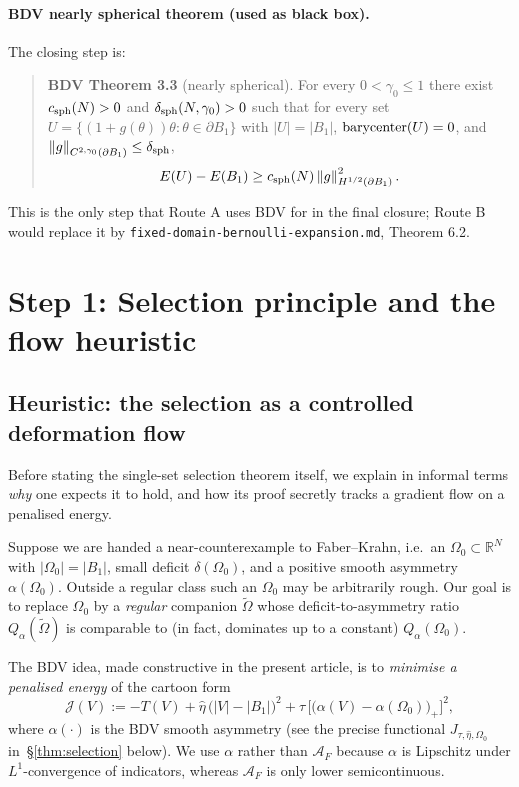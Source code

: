 \documentclass[11pt]{amsart}
\theoremstyle{definition}
\newcommand{\R}{\mathbb R}
\newcommand{\AF}{\mathcal A_F}
\newcommand{\norm}[1]{\left\|#1\right\|}
\newcommand{\abs}[1]{\left|#1\right|}
\begin{document}
\paragraph{BDV nearly spherical theorem (used as black box).}
The closing step is:
\begin{quote}
\textbf{BDV Theorem 3.3} (nearly spherical). For every $0<\gamma_0\le1$
there exist $c_{\rm sph}(N)>0$ and $\delta_{\rm sph}(N,\gamma_0)>0$ such that for every set
$U=\{(1+g(\theta))\theta:\theta\in\partial B_1\}$ with
$\abs{U}=\abs{B_1}$, $\hbox{barycenter}(U)=0$, and
$\norm{g}_{C^{2,\gamma_0}(\partial B_1)}\le\delta_{\rm sph}$,
\[
E(U)-E(B_1)\ge c_{\rm sph}(N)\norm{g}_{H^{1/2}(\partial B_1)}^2.
\]
\end{quote}
This is the only step that Route A uses BDV for in the final closure; Route B
would replace it by \texttt{fixed-domain-bernoulli-expansion.md}, Theorem 6.2.

\section{Step 1: Selection principle and the flow heuristic}\label{sec:step1-selection}



\subsection{Heuristic: the selection as a controlled deformation flow}
\label{ss:flow-heuristic}

Before stating the single-set selection theorem itself, we explain in
informal terms \emph{why} one expects it to hold, and how its proof
secretly tracks a gradient flow on a penalised energy.

Suppose we are handed a near-counterexample to Faber--Krahn, i.e.\ an
$\Omega_0\subset\R^N$ with $|\Omega_0|=|B_1|$, small deficit
$\delta(\Omega_0)$, and a positive smooth asymmetry
$\alpha(\Omega_0)$.  Outside a regular class such an $\Omega_0$ may
be arbitrarily rough.  Our goal is to replace $\Omega_0$ by a
\emph{regular} companion $\widetilde\Omega$ whose
deficit-to-asymmetry ratio $Q_\alpha(\widetilde\Omega)$ is comparable
to (in fact, dominates up to a constant) $Q_\alpha(\Omega_0)$.

The BDV idea, made constructive in the present article, is to
\emph{minimise a penalised energy} of the cartoon form
\begin{equation}\label{eq:J-cartoon}
   \mathcal{J}(V):=-T(V)+\widehat\eta\,\bigl(|V|-|B_1|\bigr)^{2}
      +\tau\,\bigl[\bigl(\alpha(V)-\alpha(\Omega_0)\bigr)_{+}\bigr]^{2},
\end{equation}
where $\alpha(\cdot)$ is the BDV smooth asymmetry (see the precise
functional $J_{\tau,\widehat\eta,\Omega_0}$
in~\S\ref{thm:selection} below).  We use $\alpha$ rather
than $\AF$ because $\alpha$ is Lipschitz under $L^{1}$-convergence of
indicators, whereas $\AF$ is only lower semicontinuous.
\end{document}
